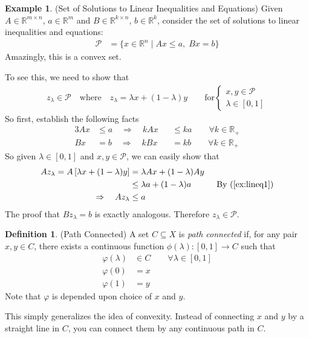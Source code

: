 \documentclass[12pt]{article}
\numberwithin{equation}{section} %
\theoremstyle{plain}
\theoremstyle{definition}
\newtheorem{defn}[thm]{Definition}
\newtheorem{ex}[thm]{Example}
\theoremstyle{remark}
\newcommand{\R}{\mathbb{R}}
\newcommand{\Rn}{\mathbb{R}^n}
\begin{document}
\begin{ex}{(Set of Solutions to Linear Inequalities and Equations)}
Given $A \in \R^{m\times n}$, $a\in \R^m$ and $B \in \R^{k \times n}$,
$b\in \R^k$, consider the set of solutions to linear inequalities and
equations:
\begin{align*}
  \mathscr{P}
  &= \{
  x\in \Rn \; | \; Ax \leq a, \; Bx = b
  \}
\end{align*}
Amazingly, this is a convex set.

To see this, we need to show that
\begin{align*}
  z_\lambda \in \mathscr{P}
  \quad \text{where} \quad
  z_\lambda = \lambda x + (1-\lambda)y
  \qquad
  \text{for}
  \begin{cases}
  x,y\in \mathscr{P}\\
  \lambda \in [0,1]
  \end{cases}
\end{align*}
So first, establish the following facts
\begin{alignat}{3}
  Ax &\leq a \quad \Rightarrow \quad
  k Ax &&\leq k a
  \qquad \forall k \in \R_+ \label{ex:lineq1}\\
  Bx &= b \quad \Rightarrow \quad
  k Bx &&= k b
  \qquad \forall k \in \R_+
  \label{ex:lineq2}
\end{alignat}
So given $\lambda \in [0,1]$ and $x,y\in \mathscr{P}$, we can easily
show that
\begin{align*}
  Az_\lambda
  = A\left[\lambda x + (1-\lambda) y\right]
  &= \lambda Ax + (1-\lambda) Ay \\
  &\leq \lambda a + (1-\lambda) a
  \quad\qquad \text{By~(\ref{ex:lineq1})} \\
  \Rightarrow \quad
  Az_\lambda
  &\leq a
\end{align*}
The proof that $Bz_\lambda = b$ is exactly analogous. Therefore
$z_\lambda\in \mathscr{P}$.
\end{ex}

\begin{defn}{(Path Connected)}
A set $C\subseteq X$ is \emph{path connected} if, for any pair $x,y\in
C$, there exists a continuous function $\phi(\lambda):[0,1]\rightarrow
C$ such that
\begin{align*}
  \varphi(\lambda) &\in C \qquad \forall \lambda \in [0,1]\\
  \varphi(0) &= x\\
  \varphi(1) &= y
\end{align*}
Note that $\varphi$ is depended upon choice of $x$ and $y$.

This simply generalizes the idea of convexity. Instead of connecting $x$
and $y$ by a straight line in $C$, you can connect them by any
continuous path in $C$.
\end{defn}
\end{document}
